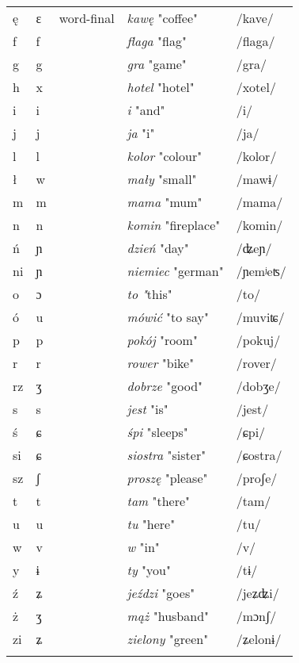 {\begin{tabular}{lllll}
        ę & ɛ & word-final & \textit{kawę} "coffee" & /kave/\\
        f & f &  & \textit{flaga} "flag" & /flaga/\\
        g & g &  & \textit{gra} "game" & /gra/\\
        h & x &  & \textit{hotel} "hotel" & /xotel/\\
        i & i &  & \textit{i} "and" & /i/\\
        j & j &  & \textit{ja} "i" & /ja/\\
        l & l &  & \textit{kolor} "colour" & /kolor/\\
        ł & w &  & \textit{mały} "small" & /mawɨ/\\
        m & m &  & \textit{mama} "mum" & /mama/\\
        n & n &  & \textit{komin} "fireplace" & /komin/\\
        ń & ɲ &  & \textit{dzień} "day" & /ʥeɲ/\\
        ni & ɲ &  & \textit{niemiec} "german" & /ɲemʲeʦ/\\
        o & ɔ &  & \textit{to} \textit{"}this" & /to/\\
        ó & u &  & \textit{mówić} "to say" & /muviʨ/\\
        p & p &  & \textit{pokój} "room" & /pokuj/\\
        r & r &  & \textit{rower} "bike" & /rover/\\
        rz & ʒ &  & \textit{dobrze} "good" & /dobʒe/\\
        s & s &  & \textit{jest} "is" & /jest/\\
        ś & ɕ &  & \textit{śpi} "sleeps" & /ɕpi/\\
        si & ɕ &  & \textit{siostra} "sister" & /ɕostra/\\
        sz & ʃ &  & \textit{proszę} "please" & /proʃe/\\
        t & t &  & \textit{tam} "there" & /tam/\\
        u & u &  & \textit{tu} "here" & /tu/\\
        w & v &  & \textit{w} "in" & /v/\\
        y & ɨ &  & \textit{ty} "you" & /tɨ/\\
        ź & ʑ &  & \textit{jeździ} "goes" & /jeʑʥi/\\
        ż & ʒ &  & \textit{mąż} "husband" & /mɔnʃ/\\
        zi & ʑ &  & \textit{zielony} "green" & /ʑelonɨ/\\
        \lspbottomrule
    \end{tabular}
}
